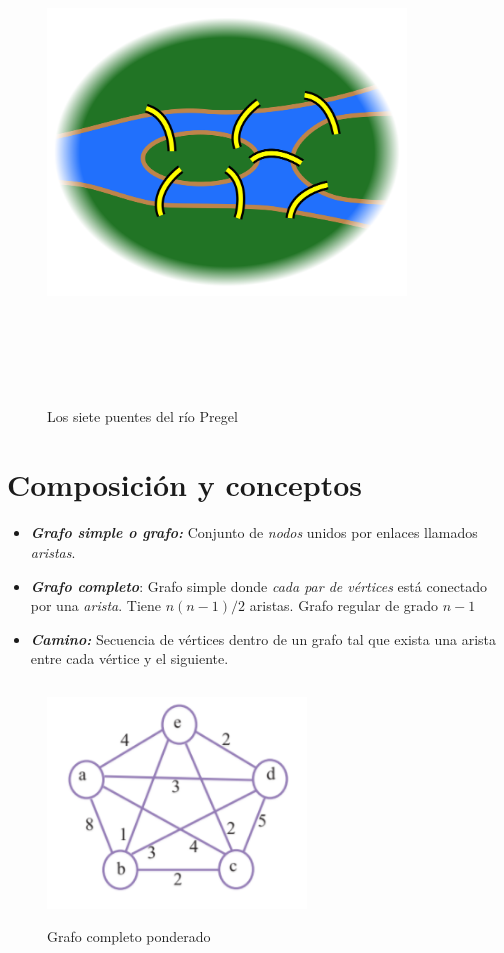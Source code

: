 \documentclass[]{book}
\begin{document}
\begin{figure}

{\centering \includegraphics[width=360,height=500]{7_bridges} 

}

\caption{Los siete puentes del río Pregel}\label{fig:unnamed-chunk-1}
\end{figure}

\section{Composición y conceptos}\label{composicion-y-conceptos}

\begin{itemize}
\item
  \textbf{\emph{Grafo simple o grafo:}} Conjunto de \emph{nodos} unidos
  por enlaces llamados \emph{aristas}.
\item
  \textbf{\emph{Grafo completo}}: Grafo simple donde \emph{cada par de
  vértices} está conectado por una \emph{arista}. Tiene \(n(n-1)/2\)
  aristas. Grafo regular de grado \(n-1\)
\item
  \textbf{\emph{Camino:}} Secuencia de vértices dentro de un grafo tal
  que exista una arista entre cada vértice y el siguiente.
\end{itemize}

\begin{figure}

{\centering \includegraphics[width=260,height=240]{grafo_completo} 

}

\caption{Grafo completo ponderado}\label{fig:unnamed-chunk-2}
\end{figure}
\end{document}
